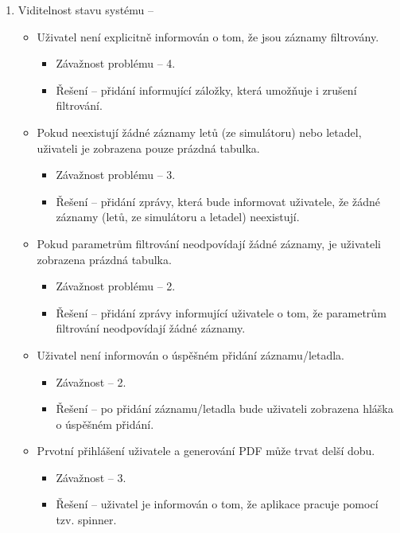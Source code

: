 \documentclass[thesis=M,czech]{FITthesis}[2012/06/26]
\begin{document}
\begin{enumerate}

\item Viditelnost stavu systému -- 
\begin{itemize}
	\item Uživatel není explicitně informován o tom, že jsou záznamy filtrovány.
 	\begin{itemize}
 		\item Závažnost problému -- 4.
 		\item Řešení -- přidání informující záložky, která umožňuje i zrušení filtrování.
 	\end{itemize}
 	\item Pokud neexistují žádné záznamy letů (ze simulátoru) nebo letadel, uživateli je zobrazena pouze prázdná tabulka.
 	\begin{itemize}
 		\item Závažnost problému -- 3.
 		\item Řešení -- přidání zprávy, která bude informovat uživatele, že žádné záznamy (letů, ze simulátoru a letadel) neexistují.
 	\end{itemize}
 	\item Pokud parametrům filtrování neodpovídají žádné záznamy, je uživateli zobrazena prázdná tabulka.
 	\begin{itemize}
 		\item Závažnost problému -- 2.
 		\item Řešení -- přidání zprávy informující uživatele o tom, že parametrům filtrování neodpovídají žádné záznamy. 	
 	\end{itemize}
 	\item Uživatel není informován o úspěšném přidání záznamu/letadla.
 	\begin{itemize}
 		\item Závažnost -- 2.
 		\item Řešení -- po přidání záznamu/letadla bude uživateli zobrazena hláška o úspěšném přidání.
 	\end{itemize}
 	\item Prvotní přihlášení uživatele a generování PDF může trvat delší dobu.
 	\begin{itemize}
 		\item Závažnost -- 3.
 		\item Řešení -- uživatel je informován o tom, že aplikace pracuje pomocí tzv. spinner. 
 	\end{itemize}
\end{itemize}
 

\end{enumerate}
\end{document}
